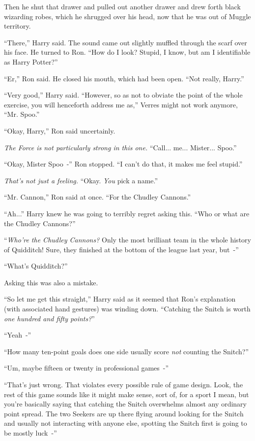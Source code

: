 Then he shut that drawer and pulled out another drawer and drew forth black wizarding robes, which he shrugged over his head, now that he was out of Muggle territory.

``There,'' Harry said. The sound came out slightly muffled through the scarf over his face. He turned to Ron. ``How do I look? Stupid, I know, but am I identifiable as Harry Potter?''

``Er,'' Ron said. He closed his mouth, which had been open. ``Not really, Harry.''

``Very good,'' Harry said. ``However, so as not to obviate the point of the whole exercise, you will henceforth address me as,'' Verres might not work anymore, ``Mr. Spoo.''

``Okay, Harry,'' Ron said uncertainly.

\emph{The Force is not particularly strong in this one.} ``Call... me... Mister... Spoo.''

``Okay, Mister Spoo~-'' Ron stopped. ``I can't do that, it makes me feel stupid.''

\emph{That's not just a feeling.} ``Okay. \emph{You} pick a name.''

``Mr. Cannon,'' Ron said at once. ``For the Chudley Cannons.''

``Ah...'' Harry knew he was going to terribly regret asking this. ``Who or what are the Chudley Cannons?''

``\emph{Who're the Chudley Cannons?} Only the most brilliant team in the whole history of Quidditch! Sure, they finished at the bottom of the league last year, but~-''

``What's Quidditch?''

Asking this was also a mistake.

``So let me get this straight,'' Harry said as it seemed that Ron's explanation (with associated hand gestures) was winding down. ``Catching the Snitch is worth \emph{one hundred and fifty points?}''

``Yeah~-''

``How many ten-point goals does one side usually score \emph{not} counting the Snitch?''

``Um, maybe fifteen or twenty in professional games~-''

``That's just wrong. That violates every possible rule of game design. Look, the rest of this game sounds like it might make sense, sort of, for a sport I mean, but you're basically saying that catching the Snitch overwhelms almost any ordinary point spread. The two Seekers are up there flying around looking for the Snitch and usually not interacting with anyone else, spotting the Snitch first is going to be mostly luck~-''

